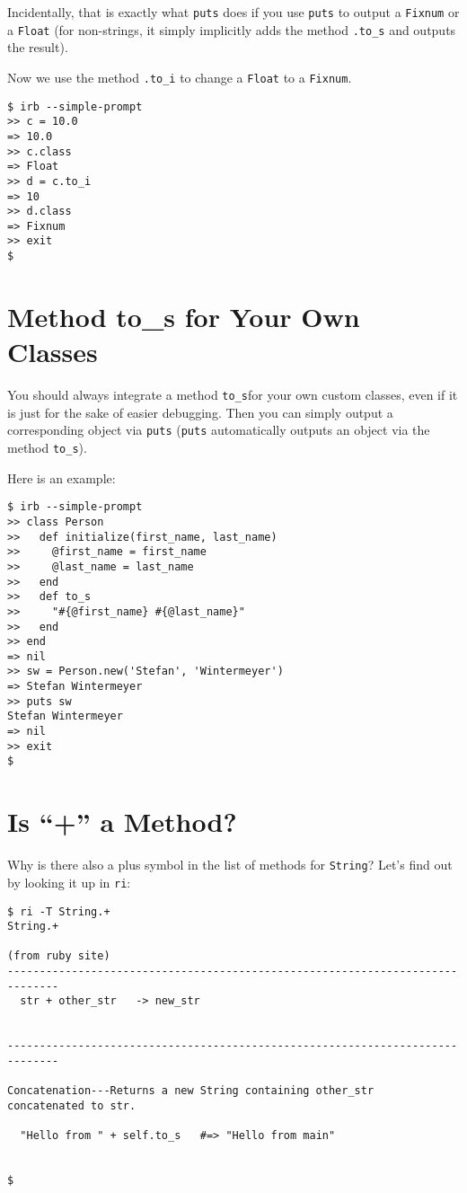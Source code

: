 \documentclass[a4paper]{book}
\newcommand{\chap}[1]{\newpage\thispagestyle{empty}\chapter{#1}\label{chap:\thechapter}}
\begin{document}
Incidentally, that is exactly what \texttt{puts} does if you use \texttt{puts} to output a \texttt{Fixnum} or a \texttt{Float} (for non-strings, it simply implicitly adds the method \texttt{.to\_s} and outputs the result).

Now we use the method \texttt{.to\_i} to change a \texttt{Float} to a \texttt{Fixnum}.

\begin{shaded}\begin{verbatim}
$ irb --simple-prompt
>> c = 10.0
=> 10.0
>> c.class
=> Float
>> d = c.to_i
=> 10
>> d.class
=> Fixnum
>> exit
$
\end{verbatim}\end{shaded}

\chap{Method to\_s for Your Own Classes}\label{method-toux5fs-for-your-own-classes}

You should always integrate a method \texttt{to\_s}for your own custom classes, even if it is just for the sake of easier debugging. Then you can simply output a corresponding object via \texttt{puts} (\texttt{puts} automatically outputs an object via the method \texttt{to\_s}).

Here is an example:

\begin{shaded}\begin{verbatim}
$ irb --simple-prompt
>> class Person
>>   def initialize(first_name, last_name)
>>     @first_name = first_name
>>     @last_name = last_name
>>   end
>>   def to_s
>>     "#{@first_name} #{@last_name}"
>>   end
>> end
=> nil
>> sw = Person.new('Stefan', 'Wintermeyer')
=> Stefan Wintermeyer
>> puts sw
Stefan Wintermeyer
=> nil
>> exit
$
\end{verbatim}\end{shaded}

\chap{Is “+” a Method?}\label{is-a-method}

Why is there also a plus symbol in the list of methods for \texttt{String}? Let's find out by looking it up in \texttt{ri}:

\begin{shaded}\begin{verbatim}
$ ri -T String.+
String.+

(from ruby site)
------------------------------------------------------------------------------
  str + other_str   -> new_str


------------------------------------------------------------------------------

Concatenation---Returns a new String containing other_str
concatenated to str.

  "Hello from " + self.to_s   #=> "Hello from main"


$
\end{verbatim}\end{shaded}
\end{document}
